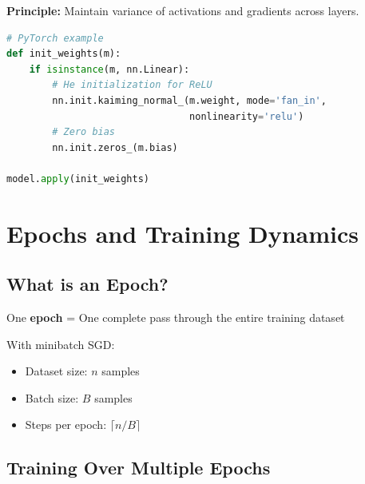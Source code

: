 \documentclass{article}
\begin{document}
\textbf{Principle:} Maintain variance of activations and gradients across layers.

\begin{lstlisting}[language=Python, caption=Initialization in practice]
# PyTorch example
def init_weights(m):
    if isinstance(m, nn.Linear):
        # He initialization for ReLU
        nn.init.kaiming_normal_(m.weight, mode='fan_in', 
                                nonlinearity='relu')
        # Zero bias
        nn.init.zeros_(m.bias)

model.apply(init_weights)
\end{lstlisting}

\section{Epochs and Training Dynamics}

\subsection{What is an Epoch?}

\begin{tcolorbox}[colback=yellow!5!white, colframe=yellow!50!black, title=Definition]
One \textbf{epoch} = One complete pass through the entire training dataset
\end{tcolorbox}

With minibatch SGD:
\begin{itemize}
\item Dataset size: $n$ samples
\item Batch size: $B$ samples
\item Steps per epoch: $\lceil n/B \rceil$
\end{itemize}

\subsection{Training Over Multiple Epochs}

\begin{center}
\end{center}
\end{document}
